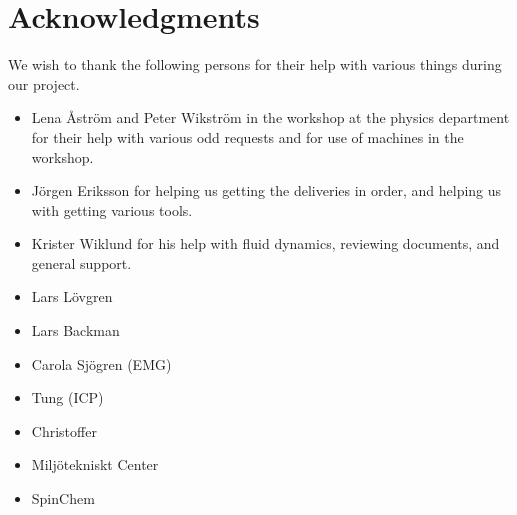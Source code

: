 \section*{Acknowledgments}
We wish to thank the following persons for their help with various things during our project.
\begin{itemize}
\item Lena Åström and Peter Wikström in the workshop at the physics department for their help with various odd requests and for use of machines in the workshop.

\item   Jörgen Eriksson for helping us getting the deliveries in order, and helping us with getting various tools.

\item   Krister Wiklund for his help with fluid dynamics, reviewing documents, and general support.

\item   Lars Lövgren

\item   Lars Backman

\item   Carola Sjögren (EMG)

\item   Tung (ICP)

\item   Christoffer

\item   Miljötekniskt Center

\item   SpinChem
\end{itemize}

